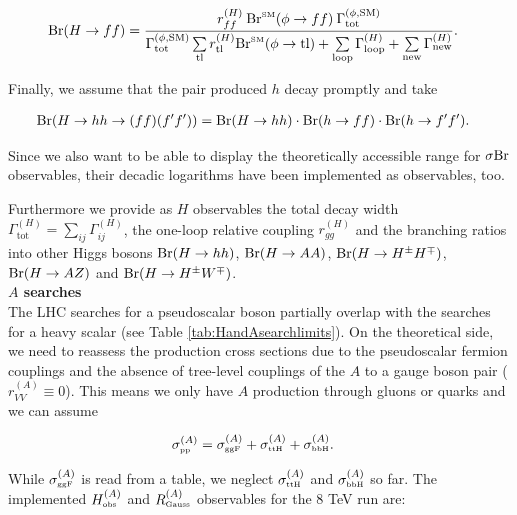 \documentclass[aps,superscriptaddress,nofootinbib,floatfix,notitlepage]{revtex4-1}
\begin{document}
\begin{align}
 {\rm Br}(H\to ff) &= \frac{r_{ff}^{(H)} \: {\rm Br}^{\text{\tiny{SM}}} (\phi \to ff) \: \Gamma^{(\phi ,\text{SM})}_{\text{tot}}}{\Gamma^{(\phi ,\text{SM})}_{\text{tot}} \sum\limits_{\rm tl} r_{\rm tl}^{(H)} {\rm Br}^{\text{\tiny{SM}}} (\phi \to {\rm tl}) + \sum\limits_{\rm loop} \Gamma_{\rm loop}^{(H)} + \sum\limits_{\rm new} \Gamma_{\rm new}^{(H)}} \nonumber .
\end{align}

Finally, we assume that the pair produced $h$ decay promptly and take

\begin{align}
 {\rm Br}(H\to hh\to (ff)(f'f')) &=  {\rm Br}(H\to hh)  \cdot {\rm Br}(h\to ff)  \cdot {\rm Br}(h\to f'f')\nonumber .
\end{align}

Since we also want to be able to display the theoretically accessible range for $\sigma {\rm Br}$ observables, their decadic logarithms have been implemented as observables, too.

Furthermore we provide as $H$ observables the total decay width $\Gamma^{(H)}_{\text{tot}}=\sum_{ij}\Gamma_{ij}^{(H)}$, the one-loop relative coupling $r_{gg}^{(H)}$ and the branching ratios into other Higgs bosons ${\rm Br}(H\to hh)$, ${\rm Br}(H\to AA)$, ${\rm Br}(H\to H^\pm H^\mp )$, ${\rm Br}(H\to AZ)$ and ${\rm Br}(H\to H^\pm W^\mp )$.\\

\textbf{$A$ searches}\\

The LHC searches for a pseudoscalar boson partially overlap with the searches for a heavy scalar (see Table \ref{tab:HandAsearchlimits}). On the theoretical side, we need to reassess the production cross sections due to the pseudoscalar fermion couplings and the absence of tree-level couplings of the $A$ to a gauge boson pair ($r_{VV}^{(A)}\equiv 0$). This means we only have $A$ production through gluons or quarks and we can assume

\begin{align}
 \sigma ^{(A)}_{\text{\tiny{pp}}} &= \sigma ^{(A)}_{\text{\tiny{ggF}}} + \sigma ^{(A)}_{\text{\tiny{ttH}}} + \sigma ^{(A)}_{\text{\tiny{bbH}}} .\nonumber
\end{align}

While $\sigma ^{(A)}_{\text{\tiny{ggF}}}$ %
is read from a table, we neglect $\sigma ^{(A)}_{\text{\tiny{ttH}}}$ and $\sigma ^{(A)}_{\text{\tiny{bbH}}}$ so far. The implemented $H^{(A)}_\text{\tiny obs}$ and $R^{(A)}_\text{\tiny Gauss}$ observables for the 8 TeV run are:
\end{document}
